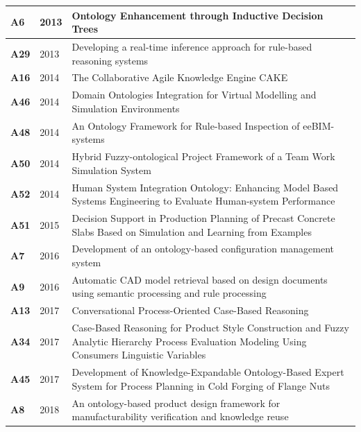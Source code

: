 {\begin{longtable}{ | m{1cm} | m{1.5cm} | m{12cm} | }
                    \hline
                    \textbf{A6} &2013 &Ontology Enhancement through Inductive Decision Trees \\
                    \hline
                    \textbf{A29} &2013 &Developing a real-time inference approach for rule-based reasoning systems \\
                    \hline
                    \textbf{A16} &2014 &The Collaborative Agile Knowledge Engine CAKE \\
                    \hline
                    \textbf{A46} &2014 &Domain Ontologies Integration for Virtual Modelling and Simulation Environments \\
                    \hline
                    \textbf{A48} &2014 &An Ontology Framework for Rule-based Inspection of eeBIM-systems \\
                    \hline
                    \textbf{A50} &2014 &Hybrid Fuzzy-ontological Project Framework of a Team Work Simulation System \\
                    \hline
                    \textbf{A52} &2014 &Human System Integration Ontology: Enhancing Model Based Systems Engineering to Evaluate Human-system Performance \\
                    \hline
                    \textbf{A51} &2015 &Decision Support in Production Planning of Precast Concrete Slabs Based on Simulation and Learning from Examples \\
                    \hline
                    \textbf{A7} &2016 &Development of an ontology-based configuration management system \\
                    \hline
                    \textbf{A9} &2016 &Automatic CAD model retrieval based on design documents using semantic processing and rule processing \\
                    \hline
                    \textbf{A13} &2017 &Conversational Process-Oriented Case-Based Reasoning \\
                    \hline
                    \textbf{A34} &2017 &Case-Based Reasoning for Product Style Construction and Fuzzy Analytic Hierarchy Process Evaluation Modeling Using Consumers Linguistic Variables \\
                    \hline
                    \textbf{A45} &2017 &Development of Knowledge-Expandable Ontology-Based Expert System for Process Planning in Cold Forging of Flange Nuts \\
                    \hline
                    \textbf{A8} &2018 &An ontology-based product design framework for manufacturability verification and knowledge reuse \\

\end{longtable}}

